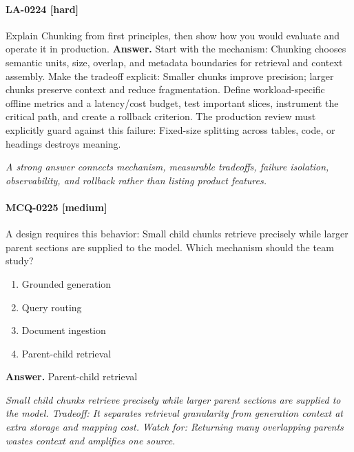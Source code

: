 \paragraph{LA-0224 [hard]} Explain Chunking from first principles, then show how you would evaluate and operate it in production.
\noindent\textbf{Answer.} Start with the mechanism: Chunking chooses semantic units, size, overlap, and metadata boundaries for retrieval and context assembly. Make the tradeoff explicit: Smaller chunks improve precision; larger chunks preserve context and reduce fragmentation. Define workload-specific offline metrics and a latency/cost budget, test important slices, instrument the critical path, and create a rollback criterion. The production review must explicitly guard against this failure: Fixed-size splitting across tables, code, or headings destroys meaning.
\par\textit{A strong answer connects mechanism, measurable tradeoffs, failure isolation, observability, and rollback rather than listing product features.}
\paragraph{MCQ-0225 [medium]} A design requires this behavior: Small child chunks retrieve precisely while larger parent sections are supplied to the model. Which mechanism should the team study?
\begin{enumerate}[label=\Alph*.]
\item Grounded generation
\item Query routing
\item Document ingestion
\item Parent-child retrieval
\end{enumerate}
\noindent\textbf{Answer.} Parent-child retrieval
\par\textit{Small child chunks retrieve precisely while larger parent sections are supplied to the model. Tradeoff: It separates retrieval granularity from generation context at extra storage and mapping cost. Watch for: Returning many overlapping parents wastes context and amplifies one source.}
